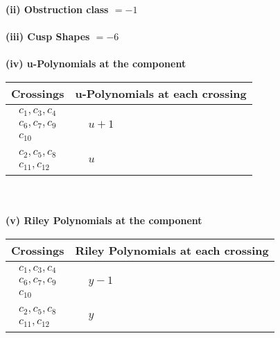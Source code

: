 \documentclass[1p]{elsarticle_modified}
\theoremstyle{definition}
\begin{document}
\flushleft \textbf{(ii) Obstruction class $= -1$}\\~\\
\flushleft \textbf{(iii) Cusp Shapes $= -6$}\\~\\
\newpage\renewcommand{\arraystretch}{1}
\flushleft \textbf{(iv) u-Polynomials at the component}\newline \\
\begin{tabular}{m{50pt}|m{274pt}}
Crossings & \hspace{64pt}u-Polynomials at each crossing \\
\hline $$\begin{aligned}c_{1},c_{3},c_{4}\\c_{6},c_{7},c_{9}\\c_{10}\end{aligned}$$&$\begin{aligned}
&u+1
\end{aligned}$\\
\hline $$\begin{aligned}c_{2},c_{5},c_{8}\\c_{11},c_{12}\end{aligned}$$&$\begin{aligned}
&u
\end{aligned}$\\
\hline
\end{tabular}\\~\\
\newpage\renewcommand{\arraystretch}{1}
\flushleft \textbf{(v) Riley Polynomials at the component}\newline \\
\begin{tabular}{m{50pt}|m{274pt}}
Crossings & \hspace{64pt}Riley Polynomials at each crossing \\
\hline $$\begin{aligned}c_{1},c_{3},c_{4}\\c_{6},c_{7},c_{9}\\c_{10}\end{aligned}$$&$\begin{aligned}
&y-1
\end{aligned}$\\
\hline $$\begin{aligned}c_{2},c_{5},c_{8}\\c_{11},c_{12}\end{aligned}$$&$\begin{aligned}
&y
\end{aligned}$\\
\hline
\end{tabular}\\~\\
\end{document}
